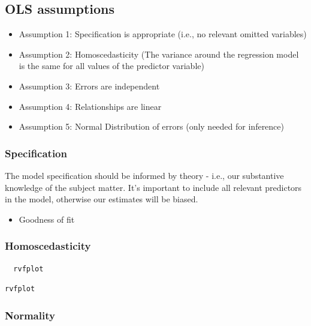 \documentclass[]{book}
\providecommand{\tightlist}{%
  \setlength{\itemsep}{0pt}\setlength{\parskip}{0pt}}
\begin{document}
\hypertarget{ols-assumptions}{%
\subsection{OLS assumptions}\label{ols-assumptions}}

\begin{itemize}
\tightlist
\item
  Assumption 1: Specification is appropriate (i.e., no relevant omitted variables)
\item
  Assumption 2: Homoscedasticity (The variance around the regression model is the same for all values of the predictor variable)
\item
  Assumption 3: Errors are independent
\item
  Assumption 4: Relationships are linear
\item
  Assumption 5: Normal Distribution of errors (only needed for inference)
\end{itemize}

\hypertarget{specification}{%
\subsubsection{Specification}\label{specification}}

The model specification should be informed by theory - i.e., our substantive knowledge of the subject matter.
It's important to include all relevant predictors in the model, otherwise our estimates will be biased.

\begin{itemize}
\tightlist
\item
  Goodness of fit
\end{itemize}

\hypertarget{homoscedasticity}{%
\subsubsection{Homoscedasticity}\label{homoscedasticity}}

\begin{verbatim}
  rvfplot
\end{verbatim}

\begin{verbatim}
rvfplot
\end{verbatim}

\hypertarget{normality}{%
\subsubsection{Normality}\label{normality}}
\end{document}
